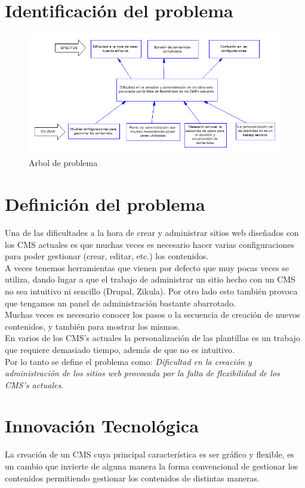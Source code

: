 \section{Identificaci\'on del problema}
\begin{figure}[h]
\centering
\includegraphics[scale=.75, keepaspectratio=true]{imagenes/01_imagen.png}
\caption{Arbol de problema}
\end{figure}

\section{Definici\'on del problema}
Una de las dificultades a la hora de crear y administrar sitios web dise\~nados con los CMS actuales es que muchas veces es necesario hacer varias configuraciones para poder gestionar (crear, editar, etc.) los contenidos.\\
A veces tenemos herramientas que vienen por defecto que muy pocas veces se utiliza, dando lugar a que el trabajo de administrar un sitio hecho con un CMS no sea intuitivo ni sencillo (Drupal, Zikula). Por otro lado esto tambi\'en provoca que tengamos un panel de administraci\'on bastante abarrotado.\\
Muchas veces es necesario conocer los pasos o la secuencia de creaci\'on de nuevos contenidos, y tambi\'en para mostrar los mismos.\\
En varios de los CMS's actuales la personalizaci\'on de las plantillas es un trabajo que requiere demasiado tiempo, adem\'as de que no es intuitivo.\\
Por lo tanto se define el problema como: \textit{Dificultad en la creaci\'on y administraci\'on de los sitios web provocada por la falta de flexibilidad de los CMS's actuales}.

\section{Innovaci\'on Tecnol\'ogica}
La creaci\'on de un CMS cuya principal caracter\'istica es ser gr\'afico y flexible, es un cambio que invierte de alguna manera la forma convencional de gestionar los contenidos permitiendo gestionar los contenidos de distintas maneras.

